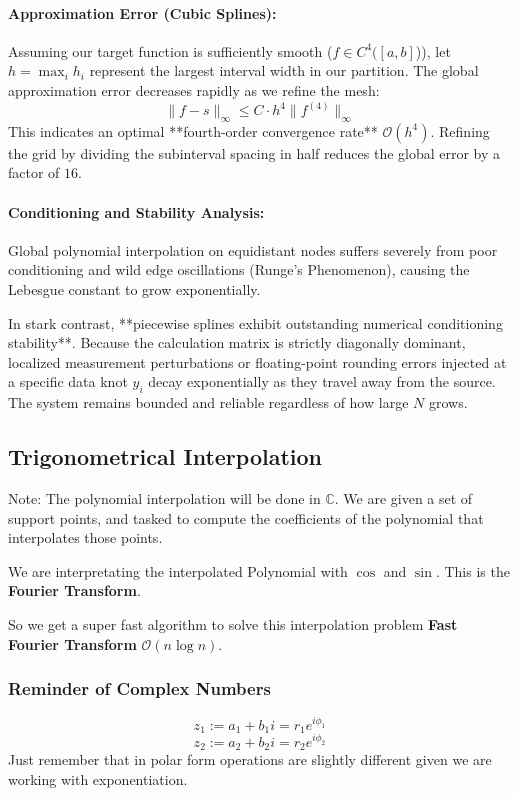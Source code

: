 \documentclass{article}
\begin{document}
\paragraph{Approximation Error (Cubic Splines):}
Assuming our target function is sufficiently smooth ($f \in C^4([a,b]$)), let $h = \max_{i} h_i$ represent the largest interval width in our partition. The global approximation error decreases rapidly as we refine the mesh:
\[\|f - s\|_{\infty} \leq C \cdot h^4 \|f^{(4)}\|_{\infty}\]
This indicates an optimal **fourth-order convergence rate** $\mathcal{O}(h^4)$. Refining the grid by dividing the subinterval spacing in half reduces the global error by a factor of $16$.

\paragraph{Conditioning and Stability Analysis:}
Global polynomial interpolation on equidistant nodes suffers severely from poor conditioning and wild edge oscillations (Runge's Phenomenon), causing the Lebesgue constant to grow exponentially. 

In stark contrast, **piecewise splines exhibit outstanding numerical conditioning stability**. Because the calculation matrix is strictly diagonally dominant, localized measurement perturbations or floating-point rounding errors injected at a specific data knot $y_i$ decay exponentially as they travel away from the source. The system remains bounded and reliable regardless of how large $N$ grows.

\subsection{Trigonometrical Interpolation}
Note: The polynomial interpolation will be done in $\mathbb{C}$. We are given a set of support points, and tasked to compute the coefficients of the polynomial that interpolates those points.

We are interpretating the interpolated Polynomial with $\cos$ and $\sin$. This is the \textbf{Fourier Transform}.

So we get a super fast algorithm to solve this interpolation problem \textbf{Fast Fourier Transform} $\mathcal{O}(n\log n)$.

\subsubsection{Reminder of Complex Numbers}
\[z_1 := a_1 + b_1 i = r_1e^{i\phi_1}\]
\[z_2 := a_2 + b_2 i = r_2e^{i\phi_2}\]
Just remember that in polar form operations are slightly different given we are working with exponentiation.
\end{document}
